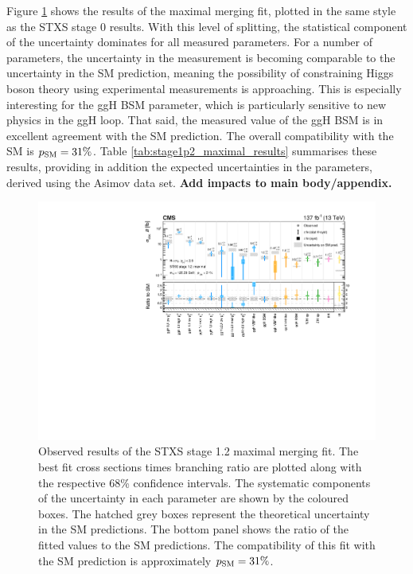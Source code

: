 Figure \ref{fig:stage1p2_maximal_results} shows the results of the maximal merging fit, plotted in the same style as the STXS stage 0 results. With this level of splitting, the statistical component of the uncertainty dominates for all measured parameters. For a number of parameters, the uncertainty in the measurement is becoming comparable to the uncertainty in the SM prediction, meaning the possibility of constraining Higgs boson theory using experimental measurements is approaching. This is especially interesting for the ggH BSM parameter, which is particularly sensitive to new physics in the ggH loop. That said, the measured value of the ggH BSM \xsbr is in excellent agreement with the SM prediction. The overall compatibility with the SM is $p_{\rm{SM}}=31\%$. Table \ref{tab:stage1p2_maximal_results} summarises these results, providing in addition the expected uncertainties in the parameters, derived using the Asimov data set. \textbf{Add impacts to main body/appendix.}

\begin{figure}[htbp]
  \centering
  \includegraphics[width=1\textwidth]{Figures/hgg_results/stage1p2_maximal_summary.pdf}
  \caption[Results of the STXS stage 1.2 maximal merging fit]
  {
    Observed results of the STXS stage 1.2 maximal merging fit. The best fit cross sections times branching ratio are plotted along with the respective 68\% confidence intervals. The systematic components of the uncertainty in each parameter are shown by the coloured boxes. The hatched grey boxes represent the theoretical uncertainty in the SM predictions. The bottom panel shows the ratio of the fitted values to the SM predictions. The compatibility of this fit with the SM prediction is approximately $p_{\rm{SM}}=31\%$. 
  }
  \label{fig:stage1p2_maximal_results}
\end{figure}

